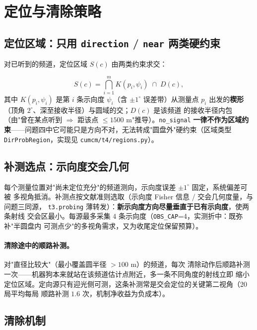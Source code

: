 \section{定位与清除策略}

\label{sec:localization}

\subsection{定位区域：只用 \texttt{direction} / \texttt{near} 两类硬约束}

对已听到的频道，定位区域 $S(c)$ 由两类约束求交：

\begin{equation}
  S(c) = \bigcap_{i=1}^{m} K(p_i, \psi_i) \;\cap\; D(c),
  \label{eq:region}
\end{equation}
其中 $K(p_i,\psi_i)$ 是第 $i$ 条示向度 $\psi_i$（含 $\pm1^\circ$ 误差带）从测量点
$p_i$ 出发的\textbf{楔形}（顶角 $2^\circ$、深至接收半径）与圆域的交；$D(c)$ 是该频道
的接收半径内包（由"曾在某点听到 $\Rightarrow$ 距该点 $\le 1500$ m"推导）。\texttt{no\_signal}
\textbf{一律不作为区域约束}——问题四中它可能只是方向不对，无法转成"圆盘外"硬约束（区域类型
\texttt{DirProbRegion}，实现见 \texttt{cumcm/t4/regions.py}）。

\subsection{补测选点：示向度交会几何}

每个测量位置对"尚未定位充分"的频道测向，示向度误差 $\pm1^\circ$ 固定，系统偏差可被
多视角抵消。补测点按文献准则选取（示向度 Fisher 信息 / 交会几何度量，与问题三同源，
\texttt{t3.probing} 薄转发）：\textbf{新示向度方向尽量垂直于已有示向度}，使两条射线
交会区最小。每源最多采集 $4$ 条示向度（\texttt{OBS\_CAP}=4，实测折中：既弥补"半圆盘内
可测点少"的多视角需求，又为收尾定位保留预算）。

\paragraph{清除途中的顺路补测。} 对"直径比较大"（最小覆盖圆半径 $>100$ m）的频道，每次
清除动作后顺路补测一次——机器狗本来就站在该频道估计点附近，多一条不同角度的射线立即
缩小定位区域。定向源只有迎光侧可测，这条补测常是交会定位的关键第二视角（20 局平均每局
顺路补测 $1.6$ 次，机制净收益为负成本）。

\subsection{清除机制}

